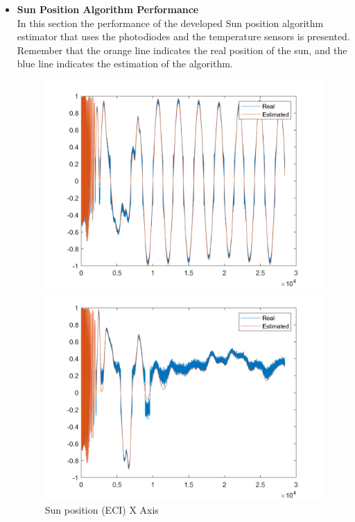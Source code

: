 \begin{itemize}
    \item \textbf{Sun Position Algorithm Performance}\\
    In this section the performance of the developed Sun position algorithm estimator that uses the photodiodes and the temperature sensors is presented. Remember that
    the orange line indicates the real position of the sun, and the blue line indicates the estimation of the algorithm. 
    \begin{figure}[H]
        \centering
        \begin{minipage}{0.32\linewidth}
            \centering
            \includegraphics[width=0.95\linewidth]{res/img/Nadir_EKF/Simulations/Sun position (ECI) X Axis.png}
            \caption{Sun position (ECI) X Axis}
            \label{fig:SunPositionECIX}
        \end{minipage}\hfill
        \begin{minipage}{0.32\linewidth}
            \centering
            \includegraphics[width=0.95\linewidth]{res/img/Nadir_EKF/Simulations/Sun position (ECI) Y Axis.png}

\end{minipage}
\end{figure}
\end{itemize}

